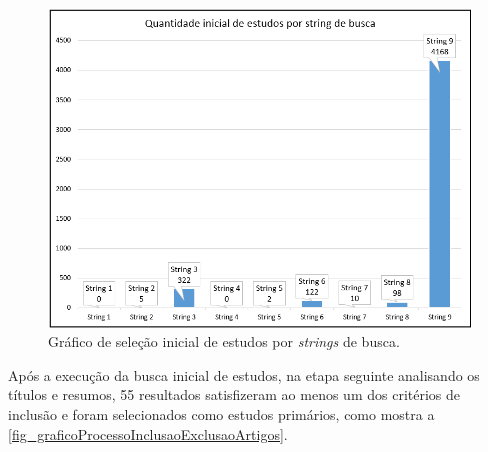 \begin{figure}[htb]
	\caption{\label{fig_graficoSelecaoInicialEstudosStrings}Gráfico de seleção inicial de estudos por \textit{strings} de busca.}
	\begin{center}
	    \includegraphics[scale=0.7]{Imagens/grafico - selecao inicial de estudos por string.png}
	\end{center}
\end{figure}

Após a execução da busca inicial de estudos, na etapa seguinte analisando os títulos e resumos, 55 resultados satisfizeram ao menos um dos critérios de inclusão e foram selecionados como estudos primários, como mostra a \autoref{fig_graficoProcessoInclusaoExclusaoArtigos}.
\newpage

